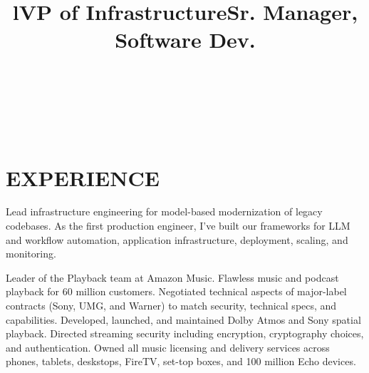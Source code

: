 \documentclass[margin]{res}
\begin{document}
\address{2528 Chilton Way\\ken@hero.net}
\address{Berkeley, CA 94704\\(310) 383-7981}

\begin{resume}

\begin{format}
\title{l}\\
\\
\body\\
\end{format}

\section{EXPERIENCE}

\title{\textbf{VP of Infrastructure}}
\begin{position}
\hspace*{.25cm}Lead infrastructure engineering for model-based modernization of legacy codebases. As the first production engineer, I've built our frameworks for LLM and workflow automation, application infrastructure, deployment, scaling, and monitoring.
\end{position}

\title{\textbf{Sr. Manager, Software Dev.}}
\begin{position}
\hspace*{.25cm}Leader of the Playback team at Amazon Music. Flawless music and podcast playback for 60 million customers. Negotiated technical aspects of major-label contracts (Sony, UMG, and Warner) to match security, technical specs, and capabilities. Developed, launched, and maintained Dolby Atmos and Sony spatial playback. Directed streaming security including encryption, cryptography choices, and authentication. Owned all music licensing and delivery services across phones, tablets, deskstops, FireTV, set-top boxes, and 100 million Echo devices. 
\end{position}


\end{resume}
\end{document}
